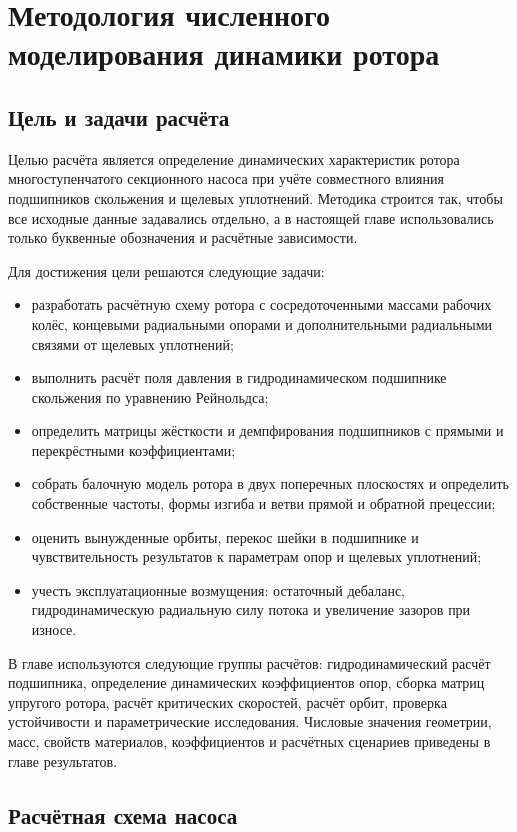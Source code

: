 \section{Методология численного моделирования динамики ротора}

\subsection{Цель и задачи расчёта}

Целью расчёта является определение динамических характеристик ротора многоступенчатого секционного насоса при учёте совместного влияния подшипников скольжения и щелевых уплотнений. Методика строится так, чтобы все исходные данные задавались отдельно, а в настоящей главе использовались только буквенные обозначения и расчётные зависимости.

Для достижения цели решаются следующие задачи:
\begin{itemize}
    \item разработать расчётную схему ротора с сосредоточенными массами рабочих колёс, концевыми радиальными опорами и дополнительными радиальными связями от щелевых уплотнений;
    \item выполнить расчёт поля давления в гидродинамическом подшипнике скольжения по уравнению Рейнольдса;
    \item определить матрицы жёсткости и демпфирования подшипников с прямыми и перекрёстными коэффициентами;
    \item собрать балочную модель ротора в двух поперечных плоскостях и определить собственные частоты, формы изгиба и ветви прямой и обратной прецессии;
    \item оценить вынужденные орбиты, перекос шейки в подшипнике и чувствительность результатов к параметрам опор и щелевых уплотнений;
    \item учесть эксплуатационные возмущения: остаточный дебаланс, гидродинамическую радиальную силу потока и увеличение зазоров при износе.
\end{itemize}

В главе используются следующие группы расчётов: гидродинамический расчёт подшипника, определение динамических коэффициентов опор, сборка матриц упругого ротора, расчёт критических скоростей, расчёт орбит, проверка устойчивости и параметрические исследования. Числовые значения геометрии, масс, свойств материалов, коэффициентов и расчётных сценариев приведены в главе результатов.

\subsection{Расчётная схема насоса}

